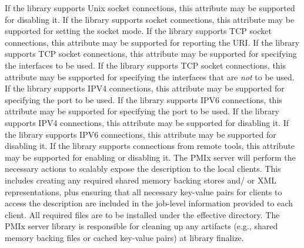  If the library supports Unix socket connections, this attribute may be supported for disabling it.
\pasteAttributeItemEnd{}
 If the library supports socket connections, this attribute may be supported for setting the socket mode.
\pasteAttributeItemEnd{}
 If the library supports TCP socket connections, this attribute may be supported for reporting the URI.
\pasteAttributeItemEnd{}
 If the library supports TCP socket connections, this attribute may be supported for specifying the interfaces to be used.
\pasteAttributeItemEnd{}
 If the library supports TCP socket connections, this attribute may be supported for specifying the interfaces that are \textit{not} to be used.
\pasteAttributeItemEnd{}
 If the library supports IPV4 connections, this attribute may be supported for specifying the port to be used.
\pasteAttributeItemEnd{}
 If the library supports IPV6 connections, this attribute may be supported for specifying the port to be used.
\pasteAttributeItemEnd{}
 If the library supports IPV4 connections, this attribute may be supported for disabling it.
\pasteAttributeItemEnd{}
 If the library supports IPV6 connections, this attribute may be supported for disabling it.
\pasteAttributeItemEnd{}
 If the library supports connections from remote tools, this attribute may be supported for enabling or disabling it.
\pasteAttributeItemEnd{}
The \ac{PMIx} server will
perform the necessary actions to scalably expose the description to the local
clients. This includes creating any required shared memory backing stores and/
or \ac{XML} representations, plus ensuring that all necessary key-value pairs
for clients to access the description are included in the job-level
information provided to each client. All required files are to be installed
under the effective  directory. The \ac{PMIx}
server library is responsible for cleaning up any artifacts (e.g., shared
memory backing files or cached key-value pairs) at library finalize.
\pasteAttributeItemEnd{}

